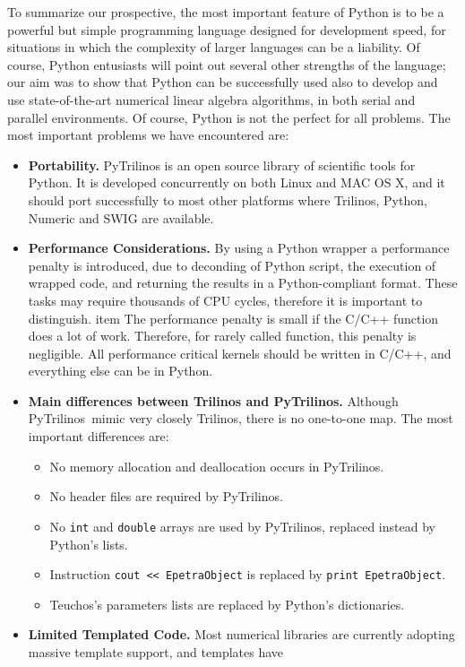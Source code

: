 \documentclass[10pt,relax]{SANDreport}
\newcommand{\PyTrilinos}{{PyTrilinos}}
\newcommand{\teuchos}{{Teuchos}}
\begin{document}
To summarize our prospective, the most important feature of Python is to be a
powerful but simple programming language designed for development speed, for
situations in which the complexity of larger languages can be a liability. Of
course, Python entusiasts will point out several other strengths of the
language; our aim was to show that Python can be successfully used also to
develop and use state-of-the-art numerical linear algebra algorithms, in both
serial and parallel environments.  Of course, Python is not the perfect for
all problems. The most important problems we have encountered are:
\begin{itemize}
\item {\bf Portability.} PyTrilinos is an open source library of scientific
  tools for Python.  It is developed concurrently on both Linux and MAC OS X,
  and it should port successfully to most other platforms where Trilinos,
  Python, Numeric and SWIG are available.
%
\item {\bf Performance Considerations.}
By using a Python wrapper a performance penalty is introduced, due to
deconding of Python script, the execution of wrapped code, and returning the
results in a Python-compliant format. These tasks may require thousands of CPU
cycles, therefore it is important to distinguish.
item The performance penalty is small if the C/C++ function does a lot of work.
Therefore, for rarely called function, this penalty is negligible.
All performance critical kernels should be written in C/C++, and
everything else can be in Python.
%
\item {\bf Main differences between Trilinos and PyTrilinos.}
Although \PyTrilinos\ mimic very closely Trilinos, there is no one-to-one
map. The most important differences are:
\begin{itemize}
\item No memory allocation and deallocation occurs in PyTrilinos.
\item No header files are required by PyTrilinos.
\item No {\tt int} and {\tt double} arrays are used by PyTrilinos, replaced instead by
Python's lists.
\item Instruction \verb!cout << EpetraObject! is replaced by \verb!print EpetraObject!.
\item \teuchos's parameters lists are replaced by Python's dictionaries.
\end{itemize}
%
\item {\bf Limited Templated Code.} Most numerical
libraries are currently adopting massive template support, and templates have

\end{itemize}
\end{document}
